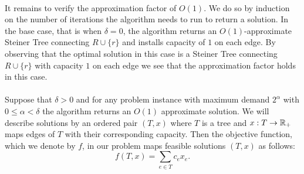 \documentclass[letterpaper,12pt,oneside,onecolumn]{article}
\begin{document}
\paragraph{}
It remains to verify the approximation factor of $O(1)$. We do so by induction on the number of iterations the algorithm needs to run to return a solution. In the base case, that is when $\delta = 0$, the algorithm returns an $O(1)$-approximate Steiner Tree connecting $R \cup \{r\}$ and installs capacity of $1$ on each edge. By observing that the optimal solution in this case is a Steiner Tree connecting $R \cup \{r\}$ with capacity $1$ on each edge we see that the approximation factor holds in this case.
\paragraph{}
Suppose that $\delta > 0$ and for any problem instance with maximum demand $2^{\alpha}$ with $0 \leq \alpha < \delta$ the algorithm returns an $O(1)$ approximate solution. We will describe solutions by an ordered pair $(T, x)$ where $T$ is a tree and $x : T \rightarrow \mathbb{R}_+$ maps edges of $T$ with their corresponding capacity. Then the objective function, which we denote by $f$, in our problem maps feasible solutions $(T,x)$ as follows:
$$f(T,x) = \sum_{e \in T} c_e x_e.$$
\end{document}
